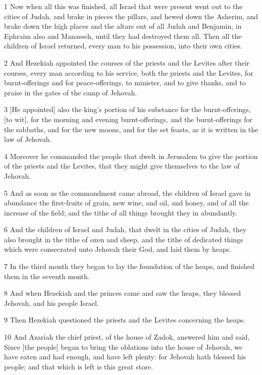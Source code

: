 \par 1 Now when all this was finished, all Israel that were present went out to the cities of Judah, and brake in pieces the pillars, and hewed down the Asherim, and brake down the high places and the altars out of all Judah and Benjamin, in Ephraim also and Manasseh, until they had destroyed them all. Then all the children of Israel returned, every man to his possession, into their own cities.
\par 2 And Hezekiah appointed the courses of the priests and the Levites after their courses, every man according to his service, both the priests and the Levites, for burnt-offerings and for peace-offerings, to minister, and to give thanks, and to praise in the gates of the camp of Jehovah.
\par 3 [He appointed] also the king's portion of his substance for the burnt-offerings, [to wit], for the morning and evening burnt-offerings, and the burnt-offerings for the sabbaths, and for the new moons, and for the set feasts, as it is written in the law of Jehovah.
\par 4 Moreover he commanded the people that dwelt in Jerusalem to give the portion of the priests and the Levites, that they might give themselves to the law of Jehovah.
\par 5 And as soon as the commandment came abroad, the children of Israel gave in abundance the first-fruits of grain, new wine, and oil, and honey, and of all the increase of the field; and the tithe of all things brought they in abundantly.
\par 6 And the children of Israel and Judah, that dwelt in the cities of Judah, they also brought in the tithe of oxen and sheep, and the tithe of dedicated things which were consecrated unto Jehovah their God, and laid them by heaps.
\par 7 In the third month they began to lay the foundation of the heaps, and finished them in the seventh month.
\par 8 And when Hezekiah and the princes came and saw the heaps, they blessed Jehovah, and his people Israel.
\par 9 Then Hezekiah questioned the priests and the Levites concerning the heaps.
\par 10 And Azariah the chief priest, of the house of Zadok, answered him and said, Since [the people] began to bring the oblations into the house of Jehovah, we have eaten and had enough, and have left plenty: for Jehovah hath blessed his people; and that which is left is this great store.
